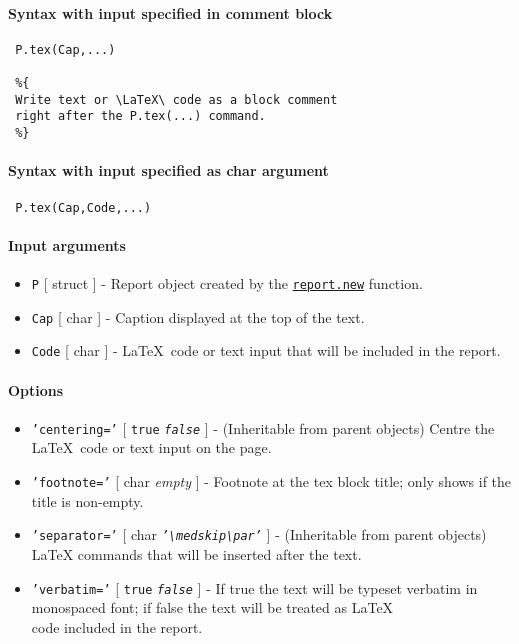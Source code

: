 


	\paragraph{Syntax with input specified in comment block}
 
 \begin{verbatim}
 P.tex(Cap,...)
 
 %{
 Write text or \LaTeX\ code as a block comment
 right after the P.tex(...) command.
 %}
 \end{verbatim}
 
 \paragraph{Syntax with input specified as char argument}
 
 \begin{verbatim}
 P.tex(Cap,Code,...)
 \end{verbatim}
 
 \paragraph{Input arguments}
 
 \begin{itemize}
 \item
   \texttt{P} {[} struct {]} - Report object created by the
   \href{report/new}{\texttt{report.new}} function.
 \item
   \texttt{Cap} {[} char {]} - Caption displayed at the top of the text.
 \item
   \texttt{Code} {[} char {]} - \LaTeX~code or text input that will be
   included in the report.
 \end{itemize}
 
 \paragraph{Options}
 
 \begin{itemize}
 \item
   \texttt{'centering='} {[} \texttt{true} \textbar{}
   \emph{\texttt{false}} {]} - (Inheritable from parent objects) Centre
   the \LaTeX~code or text input on the page.
 \item
   \texttt{'footnote='} {[} char \textbar{} \emph{empty} {]} - Footnote
   at the tex block title; only shows if the title is non-empty.
 \item
   \texttt{'separator='} {[} char \textbar{}
   \emph{\texttt{'\textbackslash{}medskip\textbackslash{}par'}} {]} -
   (Inheritable from parent objects) LaTeX commands that will be inserted
   after the text.
 \item
   \texttt{'verbatim='} {[} \texttt{true} \textbar{}
   \emph{\texttt{false}} {]} - If true the text will be typeset verbatim
   in monospaced font; if false the text will be treated as \LaTeX\\code
   included in the report.
 \end{itemize}
 
